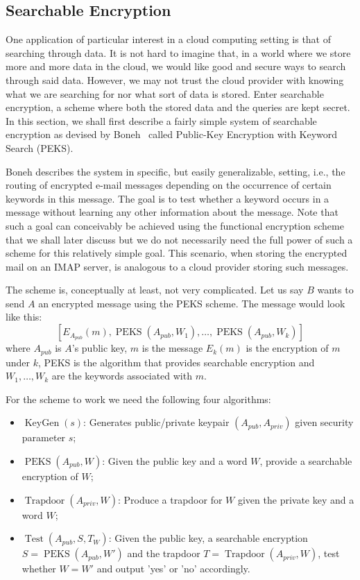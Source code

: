 \documentclass[11pt, a4paper]{article}
\newcommand{\op}[1]{\operatorname{#1}}
\begin{document}
\subsection{Searchable Encryption}

One application of particular interest in a cloud computing setting is that of searching through data.
It is not hard to imagine that, in a world where we store more and more data in the cloud, we would like good and secure ways to search through said data.
However, we may not trust the cloud provider with knowing what we are searching for nor what sort of data is stored.
Enter searchable encryption, a scheme where both the stored data and the queries are kept secret.
In this section, we shall first describe a fairly simple system of searchable encryption as devised by Boneh~\cite{boneh2004public} called Public-Key Encryption with Keyword Search (PEKS).

Boneh describes the system in specific, but easily generalizable, setting, i.e., the routing of encrypted e-mail messages depending on the occurrence of certain keywords in this message. 
The goal is to test whether a keyword occurs in a message without learning any other information about the message.
Note that such a goal can conceivably be achieved using the functional encryption scheme that we shall later discuss but we do not necessarily need the full power of such a scheme for this relatively simple goal. This scenario, when storing the encrypted mail on an IMAP server, is analogous to a cloud provider storing such messages.

The scheme is, conceptually at least, not very complicated. Let us say $B$ wants to send $A$ an encrypted message using the PEKS scheme. The message would look like this:
\[
    \left[ E_{A_{pub}}(m), \op{PEKS}(A_{pub}, W_1), \dots, \op{PEKS}(A_{pub}, W_k) \right]
\]
where $A_{pub}$ is $A$'s public key, $m$ is the message $E_k(m)$ is the encryption of $m$ under $k$, PEKS is the algorithm that provides searchable encryption and $W_1, \dots, W_k$ are the keywords associated with $m$.

For the scheme to work we need the following four algorithms:
\begin{itemize}
    \item $\op{KeyGen}(s)$: Generates public/private keypair $(A_{pub}, A_{priv})$ given security parameter $s$;
    \item $\op{PEKS}(A_{pub},W)$: Given the public key and a word $W$, provide a searchable encryption of $W$;
    \item $\op{Trapdoor}(A_{priv},W)$: Produce a trapdoor for $W$ given the private key and a word $W$;
    \item $\op{Test}(A_{pub},S,T_W)$: Given the public key, a searchable encryption $S = \op{PEKS}(A_{pub}, W')$ and the trapdoor $T = \op{Trapdoor}(A_{priv}, W)$, test whether $W = W'$ and output 'yes' or 'no' accordingly.
\end{itemize}
\end{document}
